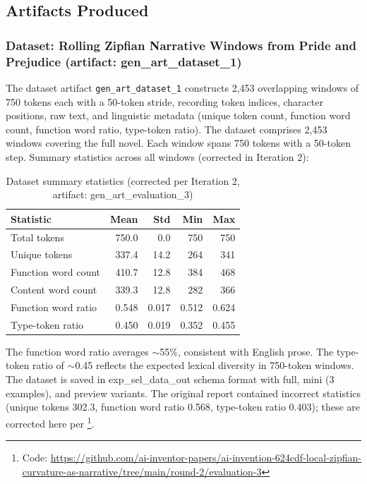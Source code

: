 \documentclass[11pt,letterpaper]{article}
\begin{document}
\subsection{Artifacts Produced}

\subsubsection{Dataset: Rolling Zipfian Narrative Windows from Pride and Prejudice (artifact: gen\_art\_dataset\_1)}

The dataset artifact \texttt{gen\_art\_dataset\_1} constructs 2,453 overlapping windows of 750 tokens each with a 50-token stride, recording token indices, character positions, raw text, and linguistic metadata (unique token count, function word count, function word ratio, type-token ratio). The dataset comprises 2,453 windows covering the full novel. Each window spans 750 tokens with a 50-token step. Summary statistics across all windows (corrected in Iteration 2):

\begin{table}[!htbp]
\centering
\caption{Dataset summary statistics (corrected per Iteration 2, artifact: gen\_art\_evaluation\_3)}
\label{tab:dataset_stats}
\begin{tabular}{lrrrr}
\toprule
Statistic & Mean & Std & Min & Max \\
\midrule
Total tokens & 750.0 & 0.0 & 750 & 750 \\
Unique tokens & 337.4 & 14.2 & 264 & 341 \\
Function word count & 410.7 & 12.8 & 384 & 468 \\
Content word count & 339.3 & 12.8 & 282 & 366 \\
Function word ratio & 0.548 & 0.017 & 0.512 & 0.624 \\
Type-token ratio & 0.450 & 0.019 & 0.352 & 0.455 \\
\bottomrule
\end{tabular}
\end{table}

The function word ratio averages $\sim$55\%, consistent with English prose. The type-token ratio of $\sim$0.45 reflects the expected lexical diversity in 750-token windows. The dataset is saved in exp\_sel\_data\_out schema format with full, mini (3 examples), and preview variants. The original report contained incorrect statistics (unique tokens 302.3, function word ratio 0.568, type-token ratio 0.403); these are corrected here per \footnote{Code: \url{https://github.com/ai-inventor-papers/ai-invention-624cdf-local-zipfian-curvature-as-narrative/tree/main/round-2/evaluation-3}}.
\end{document}
